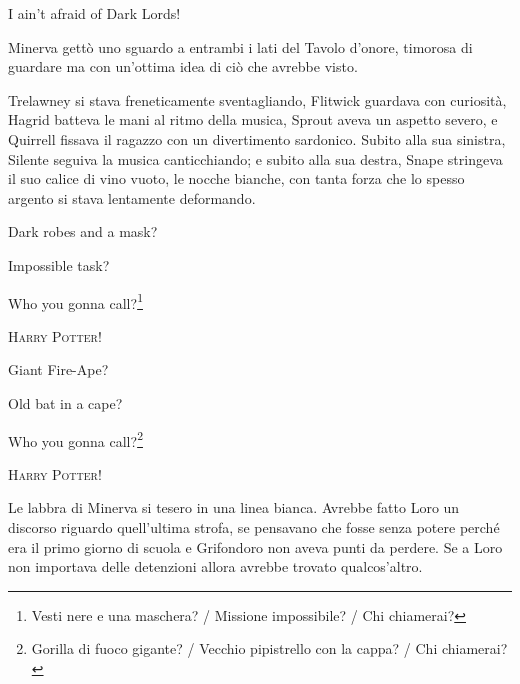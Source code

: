 \begin{center}
\begin{itpars}
I ain’t afraid of Dark Lords!
\end{itpars}
\end{center}

Minerva gettò uno sguardo a entrambi i lati del Tavolo d’onore, timorosa di guardare ma con un’ottima idea di ciò che avrebbe visto.

Trelawney si stava freneticamente sventagliando, Flitwick guardava con curiosità, Hagrid batteva le mani al ritmo della musica, Sprout aveva un aspetto severo, e Quirrell fissava il ragazzo con un divertimento sardonico. Subito alla sua sinistra, Silente seguiva la musica canticchiando; e subito alla sua destra, Snape stringeva il suo calice di vino vuoto, le nocche bianche, con tanta forza che lo spesso argento si stava lentamente deformando.

\begin{center}
\begin{itpars}
Dark robes and a mask?

Impossible task?

Who you gonna call?\footnote{Vesti nere e una maschera? / Missione impossibile? / Chi chiamerai?}
\end{itpars}

\vspace{0.8em}

\textsc{Harry Potter!}

\vspace{0.8em}

\begin{itpars}
Giant Fire-Ape?

Old bat in a cape?

Who you gonna call?\footnote{Gorilla di fuoco gigante? / Vecchio pipistrello con la cappa? / Chi chiamerai?}
\end{itpars}

\vspace{0.8em}

\textsc{Harry Potter!}

\end{center}

Le labbra di Minerva si tesero in una linea bianca. Avrebbe fatto Loro un discorso riguardo quell’ultima strofa, se pensavano che fosse senza potere perché era il primo giorno di scuola e Grifondoro non aveva punti da perdere. Se a Loro non importava delle detenzioni allora avrebbe trovato qualcos’altro.

